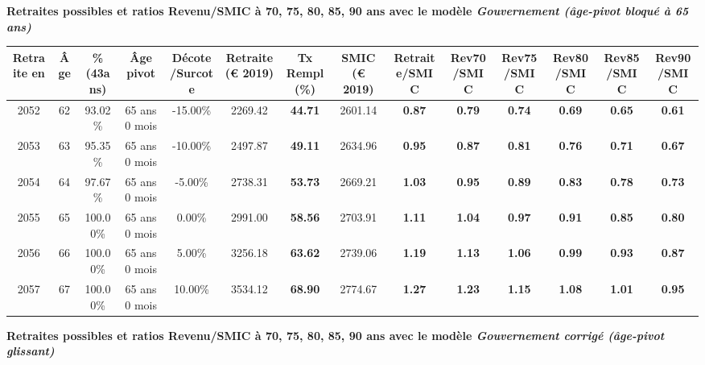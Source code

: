 {\bf \noindent Retraites possibles et ratios Revenu/SMIC à 70, 75, 80, 85, 90 ans avec le modèle \emph{Gouvernement (âge-pivot bloqué à 65 ans)}}  
 
\begin{adjustbox}{max width=\textwidth} 
\begin{tabular}[htb]{|c|c||c|c|c||c|c||c||c|c|c|c|c|c|} 
\hline 
 Retraite en &  Âge &  \%(43ans) &  Âge pivot &  Décote/Surcote &  Retraite (\euro{} 2019) &  Tx Rempl(\%) &  SMIC (\euro{} 2019) &  Retraite/SMIC &  Rev70/SMIC &  Rev75/SMIC &  Rev80/SMIC &  Rev85/SMIC &  Rev90/SMIC \\ 
\hline \hline 
 2052 &  62 &  93.02\% &  65 ans 0 mois &  -15.00\% &  2269.42 &  {\bf 44.71} &  2601.14 &  {\bf {\color{red} 0.87}} &  {\bf {\color{red} 0.79}} &  {\bf {\color{red} 0.74}} &  {\bf {\color{red} 0.69}} &  {\bf {\color{red} 0.65}} &  {\bf {\color{red} 0.61}} \\ 
\hline 
 2053 &  63 &  95.35\% &  65 ans 0 mois &  -10.00\% &  2497.87 &  {\bf 49.11} &  2634.96 &  {\bf {\color{red} 0.95}} &  {\bf {\color{red} 0.87}} &  {\bf {\color{red} 0.81}} &  {\bf {\color{red} 0.76}} &  {\bf {\color{red} 0.71}} &  {\bf {\color{red} 0.67}} \\ 
\hline 
 2054 &  64 &  97.67\% &  65 ans 0 mois &  -5.00\% &  2738.31 &  {\bf 53.73} &  2669.21 &  {\bf 1.03} &  {\bf {\color{red} 0.95}} &  {\bf {\color{red} 0.89}} &  {\bf {\color{red} 0.83}} &  {\bf {\color{red} 0.78}} &  {\bf {\color{red} 0.73}} \\ 
\hline 
 2055 &  65 &  100.00\% &  65 ans 0 mois &  0.00\% &  2991.00 &  {\bf 58.56} &  2703.91 &  {\bf 1.11} &  {\bf 1.04} &  {\bf {\color{red} 0.97}} &  {\bf {\color{red} 0.91}} &  {\bf {\color{red} 0.85}} &  {\bf {\color{red} 0.80}} \\ 
\hline 
 2056 &  66 &  100.00\% &  65 ans 0 mois &  5.00\% &  3256.18 &  {\bf 63.62} &  2739.06 &  {\bf 1.19} &  {\bf 1.13} &  {\bf 1.06} &  {\bf {\color{red} 0.99}} &  {\bf {\color{red} 0.93}} &  {\bf {\color{red} 0.87}} \\ 
\hline 
 2057 &  67 &  100.00\% &  65 ans 0 mois &  10.00\% &  3534.12 &  {\bf 68.90} &  2774.67 &  {\bf 1.27} &  {\bf 1.23} &  {\bf 1.15} &  {\bf 1.08} &  {\bf 1.01} &  {\bf {\color{red} 0.95}} \\ 
\hline 
\hline 
\end{tabular} 
\end{adjustbox} 
 
 \vspace{0.1cm} 
{\bf \noindent Retraites possibles et ratios Revenu/SMIC à 70, 75, 80, 85, 90 ans avec le modèle \emph{Gouvernement corrigé (âge-pivot glissant)}}  
 
